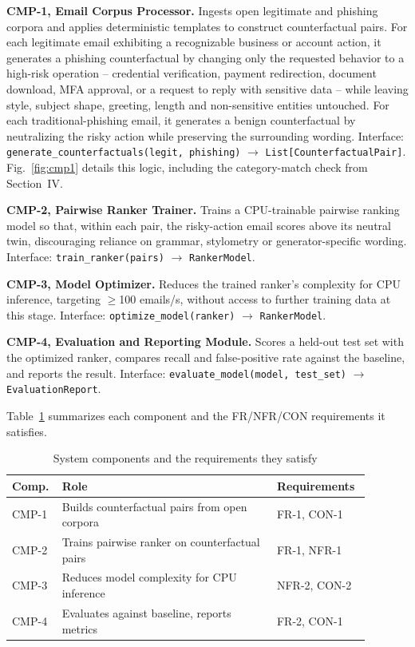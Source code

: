 \documentclass[conference]{IEEEtran}
\begin{document}
\textbf{CMP-1, Email Corpus Processor.} Ingests open legitimate and phishing corpora and applies deterministic templates to construct counterfactual pairs. For each legitimate email exhibiting a recognizable business or account action, it generates a phishing counterfactual by changing only the requested behavior to a high-risk operation -- credential verification, payment redirection, document download, MFA approval, or a request to reply with sensitive data -- while leaving style, subject shape, greeting, length and non-sensitive entities untouched. For each traditional-phishing email, it generates a benign counterfactual by neutralizing the risky action while preserving the surrounding wording. Interface: \texttt{generate\_counterfactuals(legit, phishing)} $\to$ \texttt{List[CounterfactualPair]}. Fig.~\ref{fig:cmp1} details this logic, including the category-match check from Section~IV.

\textbf{CMP-2, Pairwise Ranker Trainer.} Trains a CPU-trainable pairwise ranking model so that, within each pair, the risky-action email scores above its neutral twin, discouraging reliance on grammar, stylometry or generator-specific wording. Interface: \texttt{train\_ranker(pairs)} $\to$ \texttt{RankerModel}.

\textbf{CMP-3, Model Optimizer.} Reduces the trained ranker's complexity for CPU inference, targeting $\geq$100 emails/s, without access to further training data at this stage. Interface: \texttt{optimize\_model(ranker)} $\to$ \texttt{RankerModel}.

\textbf{CMP-4, Evaluation and Reporting Module.} Scores a held-out test set with the optimized ranker, compares recall and false-positive rate against the baseline, and reports the result. Interface: \texttt{evaluate\_model(model, test\_set)} $\to$ \texttt{EvaluationReport}.

Table~\ref{tab:components} summarizes each component and the FR/NFR/CON requirements it satisfies.

\begin{table}[t]
\centering
\caption{System components and the requirements they satisfy}
\label{tab:components}
\begin{tabular}{@{}p{0.09\linewidth}p{0.58\linewidth}p{0.22\linewidth}@{}}
\toprule
\textbf{Comp.} & \textbf{Role} & \textbf{Requirements} \\
\midrule
CMP-1 & Builds counterfactual pairs from open corpora & FR-1, CON-1 \\
CMP-2 & Trains pairwise ranker on counterfactual pairs & FR-1, NFR-1 \\
CMP-3 & Reduces model complexity for CPU inference & NFR-2, CON-2 \\
CMP-4 & Evaluates against baseline, reports metrics & FR-2, CON-1 \\
\bottomrule
\end{tabular}
\end{table}
\end{document}
